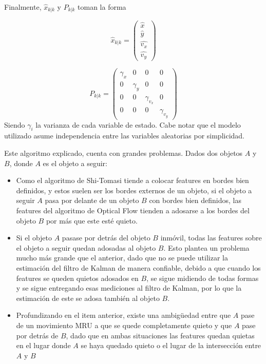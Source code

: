 Finalmente, $\hat{x}_{k|k}$ y $P_{k|k}$ toman la forma

\begin{equation}
\hat{x}_{k|k} = 
\begin{pmatrix}
\hat{x}\\
\hat{y}\\
\hat{v_x}\\
\hat{v_y}
\end{pmatrix}
\end{equation}

\begin{equation}
P_{k|k} = 
\begin{pmatrix}
\gamma_{x} & 0 & 0  & 0\\
0 & \gamma_{y}  & 0 & 0\\
0 & 0  & \gamma_{v_x}  & 0\\
0 & 0  & 0  & \gamma_{v_y} 
\end{pmatrix}
\end{equation}
Siendo $\gamma_{i}$ la varianza de cada variable de estado. Cabe notar que el modelo utilizado asume independencia entre las variables aleatorias por simplicidad.

Este algoritmo explicado, cuenta con grandes problemas. Dados dos objetos $A$ y $B$, donde $A$ es el objeto a seguir:

\begin{itemize}
\item Como el algoritmo de Shi-Tomasi tiende a colocar features en bordes bien definidos, y estos suelen ser los bordes externos de un objeto, si el objeto a seguir $A$ pasa por delante de un objeto $B$ con bordes bien definidos, las features del algoritmo de Optical Flow tienden a adosarse a los bordes del objeto $B$ por más que este esté quieto.
\item Si el objeto $A$ pasase por detrás del objeto $B$ inmóvil, todas las features sobre el objeto a seguir quedan adosadas al objeto $B$. Esto plantea un problema mucho más grande que el anterior, dado que no se puede utilizar la estimación del filtro de Kalman de manera confiable, debido a que cuando los features se queden quietos adosados en $B$, se sigue midiendo de todas formas y se sigue entregando esas mediciones al filtro de Kalman, por lo que la estimación de este se adosa también al objeto $B$.
\item Profundizando en el item anterior, existe una ambigüedad entre que $A$ pase de un movimiento MRU a que se quede completamente quieto y que $A$ pase por detrás de $B$, dado que en ambas situaciones las features quedan quietas en el lugar donde $A$ se haya quedado quieto o el lugar de la intersección entre $A$ y $B$
\end{itemize}




























